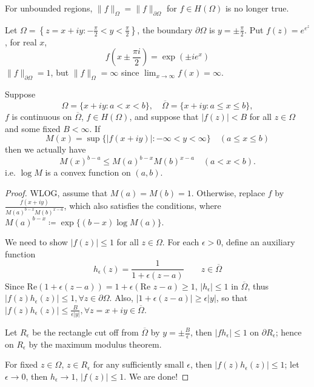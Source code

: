 For unbounded regions, $\lVert f \rVert_{\Omega}=\lVert f \rVert_{\partial \Omega}$ for $f\in H(\Omega)$ is no longer true.

\begin{example}
Let $\Omega=\left\{  z=x+iy:-\frac{\pi}{2}<y<\frac{\pi}{2}  \right\}$, the boundary $\partial \Omega$ is $y=\pm \frac{\pi}{2}$. Put $f(z)=e^{ e^{ z } }$, for real $x$,
\[
f\left( x\pm\frac{\pi i}{2} \right)=\exp(\pm ie^{ x })
\]
$\lVert f \rVert_{\partial \Omega}=1$, but $\lVert f \rVert_{\Omega}=\infty$ since $\lim_{ x \to \infty }f(x)= \infty$.
\end{example}
\begin{theorem}
Suppose
\[
\Omega = \{x + iy : a < x < b\}, \quad \overline{\Omega} = \{x + iy : a \leq x \leq b\},
\]$f$ is continuous on $\overline{\Omega}$, $f \in H(\Omega)$, and suppose that $|f(z)| < B$ for all $z \in \Omega$ and some fixed $B < \infty$. If
\[
M(x) = \sup \{|f(x+iy)| : -\infty < y < \infty\} \quad (a \leq x \leq b)
\]then we actually have
\[
M(x)^{b-a} \leq M(a)^{b-x} M(b)^{x-a} \quad (a < x < b).
\]i.e. $\log M$ is a convex function on $(a,b)$.
\end{theorem}
\begin{proof}
WLOG, assume that $M(a)=M(b)=1$. Otherwise, replace $f$ by $\frac{f(x+iy)}{M(a)^{b-x}M(b)^{x-a}}$, which also satisfies the conditions, where $M(a)^{b-x}\coloneqq \exp \{ (b-x)\log M(a) \}$.

We need to show $\lvert f(z) \rvert\leq1$ for all $z\in \Omega$. For each $\epsilon>0$, define an auxiliary function
\[
h_{\epsilon}(z)=\frac{1}{1+\epsilon(z-a)}\qquad z\in \overline{\Omega}
\]
Since $\mathrm{Re}(1+\epsilon(z-a))=1+\epsilon(\text{Re }z-a)\geq1$, $\lvert h_{\epsilon} \rvert\leq1$ in $\overline{\Omega}$, thus $\lvert f (z) h_{\epsilon}(z) \rvert\leq1,\forall z\in \partial \Omega$. Also, $\lvert 1+\epsilon(z-a) \rvert\geq\epsilon \lvert y \rvert$, so that $\lvert f (z) h_{\epsilon}(z) \rvert\leq\frac{B}{\epsilon \lvert y \rvert},\forall z=x+iy\in \overline{\Omega}$.

Let $R_{\epsilon}$ be the rectangle cut off from $\overline{\Omega}$ by $y=\pm\frac{B}{\epsilon}$, then $\lvert fh_{\epsilon} \rvert\leq1$ on $\partial R_{\epsilon}$; hence on $R_{\epsilon}$ by the maximum modulus theorem.

For fixed $z\in \Omega$, $z\in R_{\epsilon}$ for any sufficiently small $\epsilon$, then $\lvert f(z)h_{\epsilon}(z) \rvert\leq1$; let $\epsilon\to0$, then $h_{\epsilon}\to1$, $\lvert f (z)\rvert\leq1$. We are done!
\end{proof}

